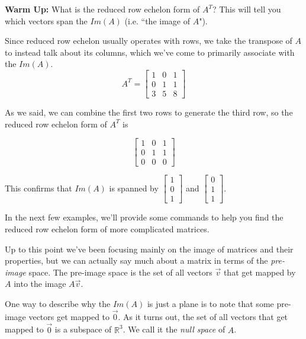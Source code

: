 \documentclass{ximera}
\begin{document}
\begin{problem}{{\bf Warm Up:}}
    What is the reduced row echelon form of $A^T$? This will tell you which vectors span the $Im(A)$ (i.e. ``the image of $A$").
    \begin{solution}
        Since reduced row echelon usually operates with rows, we take the transpose of $A$ to instead talk about its columns, which we've come to primarily associate with the $Im(A)$.
        \[
            A^T = 
            \begin{bmatrix}
            1 & 0 & 1 \\
            0 & 1 & 1 \\
            3 & 5 & 8
            \end{bmatrix}
            \]

        As we said, we can combine the first two rows to generate the third row, so the reduced row echelon form of $A^T$ is

        \[
            \begin{bmatrix}
            1 & 0 & 1 \\
            0 & 1 & 1 \\
            0 & 0 & 0
            \end{bmatrix}
        \]

        This confirms that $Im(A)$ is spanned by $\begin{bmatrix} 1 \\ 0 \\ 1 \end{bmatrix}$ and $\begin{bmatrix} 0 \\ 1 \\ 1 \end{bmatrix}$.

        In the next few examples, we'll provide some commands to help you find the reduced row echelon form of more complicated matrices.
    \end{solution}

\end{problem}

Up to this point we've been focusing mainly on the image of matrices and their properties, but we can actually say much about a matrix in terms of the \emph{pre-image} space. The pre-image space is the set of all vectors $\vec{v}$ that get mapped by $A$ into the image $A\vec{v}$. 

One way to describe why the $Im(A)$ is just a plane is to note that some pre-image vectors get mapped to $\vec{0}$. As it turns out, the set of all vectors that get mapped to $\vec{0}$ is a subspace of $\mathbb{R}^3$. We call it the \emph{null space} of $A$.
\end{document}
